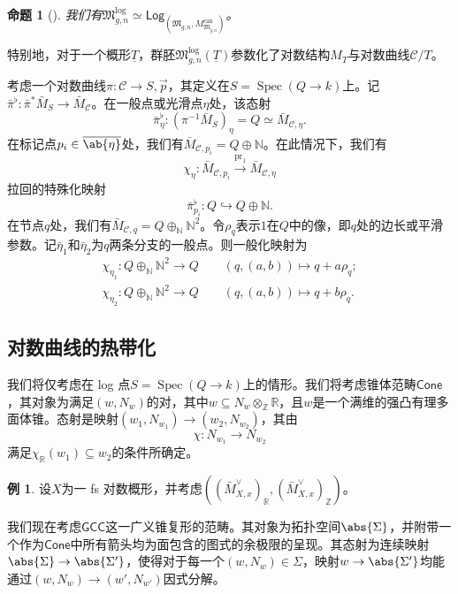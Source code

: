 \documentclass{amsart}
\newtheorem{prop}[thm]{命题}
\theoremstyle{definition}
\newtheorem{exm}[thm]{例}
\theoremstyle{remark}
\theoremstyle{plain}
\theoremstyle{definition}
\theoremstyle{remark}
\newcommand{\N}{\mathbb{N}}
\newcommand{\R}{\mathbb{R}}
\newcommand{\Z}{\mathbb{Z}}
\newcommand{\mc}[1]{\mathcal{#1}}
\newcommand{\mf}[1]{\mathfrak{#1}}
\newcommand{\on}[1]{\operatorname{#1}}
\newcommand{\ms}[1]{\mathsf{#1}}
\newcommand{\ol}[1]{\overline{#1}}
\newcommand{\ul}[1]{\underline{#1}}
\newcommand{\1}{\mathbf{1}}
\newcommand{\2}{\mathbf{2}}
\newcommand{\3}{\mathbf{3}}
\DeclareMathOperator{\Spec}{Spec}
\begin{document}
\begin{prop}[{\cite{FKato2000,Olsson2003}}]
我们有\(\mf{M}_{g,n}^{\log} \simeq \ms{Log}_{(\mf{M}_{g,n}, M_{\mf{M}_{g,n}}^{\on{can}})}\)。
\end{prop}

特别地，对于一个概形\(\ul{T}\)，群胚\(\mf{M}_{g,n}^{\log}(\ul{T})\)参数化了对数结构\(M_T\)与对数曲线\(\mc{C} / T\)。

考虑一个对数曲线\(\pi \colon \mc{C} \to S, \vec{p}\)，其定义在\(S = \Spec (Q \to k)\)上。记\(\bar{\pi}^{\flat} \colon \bar{\pi}^* \bar{M}_S \to \bar{M}_{\mc{C}}\)。在一般点或光滑点\(\eta\)处，该态射
\[ \bar{\pi}_{\eta}^{\flat} \colon (\pi^{-1} \bar{M}_S)_{\eta} = Q \simeq \bar{M}_{\mc{C}, \eta}. \]
在标记点\(p_i \in \ol{\ab\{\eta\}}\)处，我们有\(\bar{M}_{\mc{C}, p_i} = Q \oplus \N\)。在此情况下，我们有
\[ \chi_{\eta} \colon \bar{M}_{\mc{C}, p_i} \xrightarrow{\on{pr}_1} \bar{M}_{\mc{C}, \eta} \]
拉回的特殊化映射
\[ \bar{\pi}_{p_i}^{\flat} \colon Q \hookrightarrow Q \oplus \N. \]
在节点\(q\)处，我们有\(\bar{M}_{\mc{C}, q} = Q \oplus_{\N} \N^2\)。令\(\rho_q\)表示\(1\)在\(Q\)中的像，即\(q\)处的边长或平滑参数。记\(\bar{\eta}_1\)和\(\bar{\eta}_2\)为\(q\)两条分支的一般点。则一般化映射为
\begin{align*}
    \chi_{\eta_1} \colon Q \oplus_{\N} \N^2 \to Q \qquad (q, (a,b)) \mapsto q + a \rho_q ;\\
    \chi_{\eta_2} \colon Q \oplus_{\N} \N^2 \to Q \qquad (q, (a,b)) \mapsto q + b \rho_q .
\end{align*}

\subsection{对数曲线的热带化}%
\label{sub:Tropicalization of log curves}

我们将仅考虑在 log 点\(S = \Spec(Q \to k)\)上的情形。我们将考虑锥体范畴\(\ms{Cone}\)，其对象为满足\((w, N_w)\)的对，其中\(w \subseteq N_w \otimes_{\Z} \R\)，且\(w\)是一个满维的强凸有理多面体锥。态射是映射\((w_1, N_{w_1}) \to (w_2, N_{w_2})\)，其由
\[ \chi \colon N_{w_1} \to N_{w_2} \]
满足\(\chi_{\R}(w_1) \subseteq w_2\)的条件所确定。

\begin{exm}
    设\(X\)为一 fs 对数概形，并考虑\(( (\bar{M}_{X,x}^{\vee})_{\R}, (\bar{M}_{X,x}^{\vee})_{\Z} )\)。
\end{exm}

我们现在考虑\(\ms{GCC}\)这一广义锥复形的范畴。其对象为拓扑空间\(\abs{\Sigma}\)，并附带一个作为\(\ms{Cone}\)中所有箭头均为面包含的图式的余极限的呈现。其态射为连续映射\(\abs{\Sigma} \to \abs{\Sigma'}\)，使得对于每一个\((w, N_w) \in \Sigma\)，映射\(w \to \abs{\Sigma'}\)均能通过\((w, N_w) \to (w', N_{w'})\)因式分解。
\end{document}
